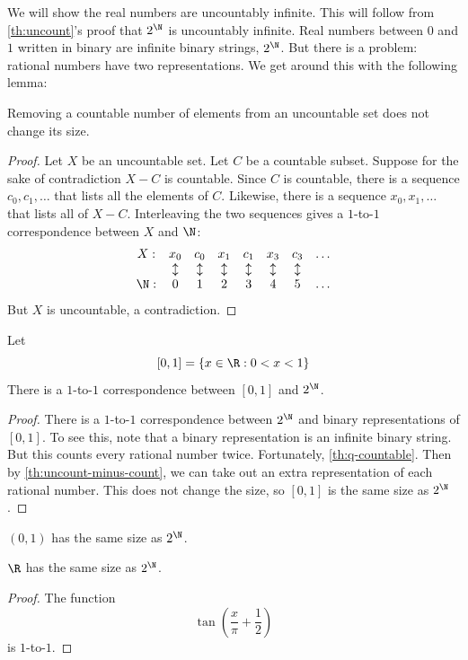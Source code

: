 \message{ !name(truth.tex)}\documentclass{scrbook}
\begin{document}
We will show the real numbers are uncountably infinite. This will follow from \cref{th:uncount}'s proof that $2^\N$ is uncountably infinite. Real numbers between $0$ and $1$ written in binary are infinite binary strings, $2^\N$. But there is a problem: rational numbers have two representations. We get around this with the following lemma:

\begin{lemma}\label{th:uncount-minus-count}
  Removing a countable number of elements from an uncountable set does not change its size. 
\end{lemma}
\begin{proof}
  Let $X$ be an uncountable set. Let $C$ be a countable subset. Suppose for the sake of contradiction $X-C$ is countable. Since $C$ is countable, there is a sequence $c_0,c_1,\dots$ that lists all the elements of $C$. Likewise, there is a sequence $x_0,x_1,\dots$ that lists all of $X-C$. Interleaving the two sequences gives a $1$-to-$1$ correspondence between $X$ and $\N$:
  \[
  \begin{matrix}
    X:  & x_0 & c_0 & x_1 & c_1 & x_3 & c_3 & \dots \\
    {}  & \updownarrow &\updownarrow &\updownarrow &\updownarrow &\updownarrow &\updownarrow & \\
    \N: & 0 & 1 & 2 & 3 & 4 & 5 &\dots
  \end{matrix}
  \]
  But $X$ is uncountable, a contradiction. 
\end{proof}

\begin{theorem}
  Let
  \[
  [0,1]=\{x\in\R:0<x<1\}
  \]
  There is a $1$-to-$1$ correspondence between $[0,1]$ and $2^\N$.
\end{theorem}
\begin{proof}
  There is a $1$-to-$1$ correspondence between $2^\N$ and binary representations of $[0,1]$. To see this, note that a binary representation is an infinite binary string. But this counts every rational number twice. Fortunately, \cref{th:q-countable}. Then by \cref{th:uncount-minus-count}, we can take out an extra representation of each rational number. This does not change the size, so $[0,1]$ is the same size as $2^\N$. 
\end{proof}
\begin{cor}
  $(0,1)$ has the same size as $2^\N$. 
\end{cor}
\begin{cor}
  $\R$ has the same size as $2^\N$. 
\end{cor}
\begin{proof}
  The function
  \[
  \tan\left(\frac x\pi +\frac 12\right)
  \]
  is $1$-to-$1$. 
\end{proof}
\end{document}
